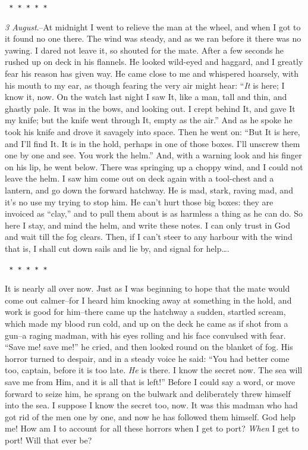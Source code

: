 \documentclass[12pt,openright]{book}
\begin{document}
\texttt{   *       *       *       *       *}

\textit{3 August}.–At midnight I went to relieve the man at the wheel, and when I got to it found no one there. The wind was steady, and as we ran before it there was no yawing. I dared not leave it, so shouted for the mate. After a few seconds he rushed up on deck in his flannels. He looked wild-eyed and haggard, and I greatly fear his reason has given way. He came close to me and whispered hoarsely, with his mouth to my ear, as though fearing the very air might hear: “\textit{It} is here; I know it, now. On the watch last night I saw It, like a man, tall and thin, and ghastly pale. It was in the bows, and looking out. I crept behind It, and gave It my knife; but the knife went through It, empty as the air.” And as he spoke he took his knife and drove it savagely into space. Then he went on: “But It is here, and I’ll find It. It is in the hold, perhaps in one of those boxes. I’ll unscrew them one by one and see. You work the helm.” And, with a warning look and his finger on his lip, he went below. There was springing up a choppy wind, and I could not leave the helm. I saw him come out on deck again with a tool-chest and a lantern, and go down the forward hatchway. He is mad, stark, raving mad, and it’s no use my trying to stop him. He can’t hurt those big boxes: they are invoiced as “clay,” and to pull them about is as harmless a thing as he can do. So here I stay, and mind the helm, and write these notes. I can only trust in God and wait till the fog clears. Then, if I can’t steer to any harbour with the wind that is, I shall cut down sails and lie by, and signal for help….

\texttt{   *       *       *       *       *}

It is nearly all over now. Just as I was beginning to hope that the mate would come out calmer–for I heard him knocking away at something in the hold, and work is good for him–there came up the hatchway a sudden, startled scream, which made my blood run cold, and up on the deck he came as if shot from a gun–a raging madman, with his eyes rolling and his face convulsed with fear. “Save me! save me!” he cried, and then looked round on the blanket of fog. His horror turned to despair, and in a steady voice he said: “You had better come too, captain, before it is too late. \textit{He} is there. I know the secret now. The sea will save me from Him, and it is all that is left!” Before I could say a word, or move forward to seize him, he sprang on the bulwark and deliberately threw himself into the sea. I suppose I know the secret too, now. It was this madman who had got rid of the men one by one, and now he has followed them himself. God help me! How am I to account for all these horrors when I get to port? \textit{When} I get to port! Will that ever be?
\end{document}
